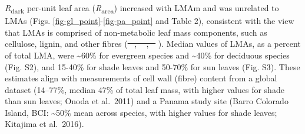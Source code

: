 \documentclass[
  12pt,
  letterpaper,
  DIV=11,
  numbers=noendperiod]{scrartcl}
\providecommand{\DIFadd}[1]{{\protect\color{blue}\uwave{#1}}} %
\providecommand{\DIFdel}[1]{{\protect\color{red}\sout{#1}}}                      %
\providecommand{\DIFaddbegin}{} %
\providecommand{\DIFaddend}{} %
\providecommand{\DIFdelbegin}{} %
\providecommand{\DIFdelend}{} %
\newcommand{\DIFscaledelfig}{0.5}
\newlength{\DIFdelgraphicswidth} %
\newlength{\DIFdelgraphicsheight} %
\newcommand{\DIFaddincludegraphics}[2][]{{\color{blue}\fbox{\DIFOincludegraphics[#1]{#2}}}} %
\newcommand{\DIFdelincludegraphics}[2][]{%
\sbox{\DIFdelgraphicsbox}{\DIFOincludegraphics[#1]{#2}}%
\settoboxwidth{\DIFdelgraphicswidth}{\DIFdelgraphicsbox} %
\settoboxtotalheight{\DIFdelgraphicsheight}{\DIFdelgraphicsbox} %
\scalebox{\DIFscaledelfig}{%
\parbox[b]{\DIFdelgraphicswidth}{\usebox{\DIFdelgraphicsbox}\\[-\baselineskip] \rule{\DIFdelgraphicswidth}{0em}}\llap{\resizebox{\DIFdelgraphicswidth}{\DIFdelgraphicsheight}{%
\setlength{\unitlength}{\DIFdelgraphicswidth}%
\begin{picture}(1,1)%
\thicklines\linethickness{2pt} %
{\color[rgb]{1,0,0}\put(0,0){\framebox(1,1){}}}%
{\color[rgb]{1,0,0}\put(0,0){\line( 1,1){1}}}%
{\color[rgb]{1,0,0}\put(0,1){\line(1,-1){1}}}%
\end{picture}%
}\hspace*{3pt}}} %
} %
\DeclareRobustCommand{\DIFaddbegin}{\DIFOaddbegin \let\includegraphics\DIFaddincludegraphics} %
\DeclareRobustCommand{\DIFaddend}{\DIFOaddend \let\includegraphics\DIFOincludegraphics} %
\DeclareRobustCommand{\DIFdelbegin}{\DIFOdelbegin \let\includegraphics\DIFdelincludegraphics} %
\DeclareRobustCommand{\DIFdelend}{\DIFOaddend \let\includegraphics\DIFOincludegraphics} %
\begin{document}
\emph{R}\textsubscript{dark} per-unit leaf area
(\emph{R}\textsubscript{area}) increased with LMAm and was unrelated to
LMAs (Figs. \ref{fig-gl_point}-\ref{fig-pa_point} and Table 2),
consistent with the view that LMAs is comprised of non-metabolic leaf
mass components, such as cellulose, lignin, and other fibres
(\DIFdelbegin \DIFdel{\mbox{%
\citeproc{ref-Onoda2011}{Onoda et al. 2011}}\hspace{0pt}%
,
\mbox{%
\citeproc{ref-Kitajima2012}{Kitajima et al. 2012}}\hspace{0pt}%
,
\mbox{%
\citeproc{ref-Kitajima2016}{2016}}\hspace{0pt}%
}\DIFdelend \DIFaddbegin \DIFadd{\mbox{%
\citeproc{ref-Kitajima2016}{Kitajima et al., 2016}}\hspace{0pt}%
,
\mbox{%
\citeproc{ref-Kitajima2012}{2012}}\hspace{0pt}%
; \mbox{%
\citeproc{ref-Onoda2011}{Onoda et
al., 2011}}\hspace{0pt}%
}\DIFaddend ). Median values of LMAs, as a percent of total LMA, were
\textasciitilde60\% for evergreen species and \textasciitilde40\% for
deciduous species (Fig. S2), and 15-40\% for shade leaves and 50-70\%
for sun leaves (Fig. S3). These estimates align with measurements of
cell wall (fibre) content from a global dataset (14--77\%, median 47\%
of total leaf mass, with higher values for shade than sun leaves; Onoda
et al.~2011) and a Panama study site (Barro Colorado Island, BCI:
\textasciitilde50\% mean across species, with higher values for shade
leaves; Kitajima et al.~2016).
\end{document}
